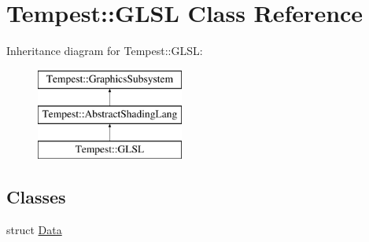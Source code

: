 \hypertarget{class_tempest_1_1_g_l_s_l}{\section{Tempest\+:\+:G\+L\+S\+L Class Reference}
\label{class_tempest_1_1_g_l_s_l}
}
Inheritance diagram for Tempest\+:\+:G\+L\+S\+L\+:\begin{figure}[H]
\begin{center}
\leavevmode
\includegraphics[height=3.000000cm]{class_tempest_1_1_g_l_s_l}
\end{center}
\end{figure}
\subsection*{Classes}
\begin{DoxyCompactItemize}
\item 
struct \hyperlink{struct_g_l_s_l_1_1_data}{Data}
\end{DoxyCompactItemize}
